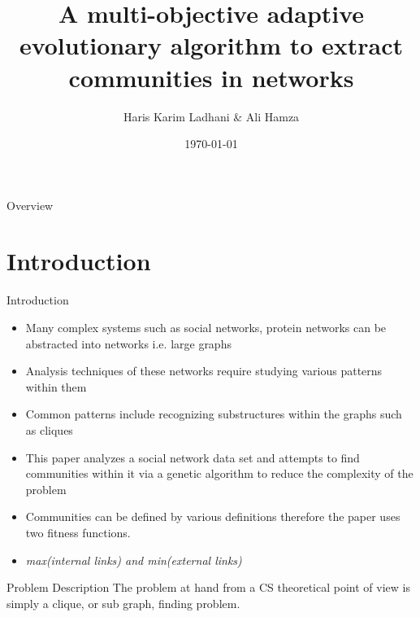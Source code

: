 \documentclass[aspectratio=169,xcolor=dvipsnames]{beamer}
\title[short title]{A multi-objective adaptive evolutionary algorithm to extract communities in networks} %
\author[Haris-Ali] {Haris Karim Ladhani \& Ali Hamza}
\institute[HU-CI] %
{
    CS 451 - Computational Intelligence \\
    Habib University %
}
\date{\today} %
\begin{document}
\begin{frame}
    \titlepage
\end{frame}

\begin{frame}{Overview}
    \tableofcontents
\end{frame}

\section{Introduction}

\begin{frame}{Introduction}
\begin{itemize}
    \item Many complex systems such as social networks, protein networks can be abstracted into networks i.e. large graphs
    \item Analysis techniques of these networks require studying various patterns within them
    \item Common patterns include recognizing substructures within the graphs such as cliques
    \item This paper analyzes a social network data set and attempts to find communities within it via a genetic algorithm to reduce the complexity of the problem
    \item Communities can be defined by various definitions therefore the paper uses two fitness functions.
    \item \textit{max(internal links) and min(external links)}
\end{itemize}

\end{frame}

\begin{frame}{Problem Description}
    The problem at hand from a CS theoretical point of view is simply a clique, or sub graph, finding problem. 
\end{frame}
\end{document}
